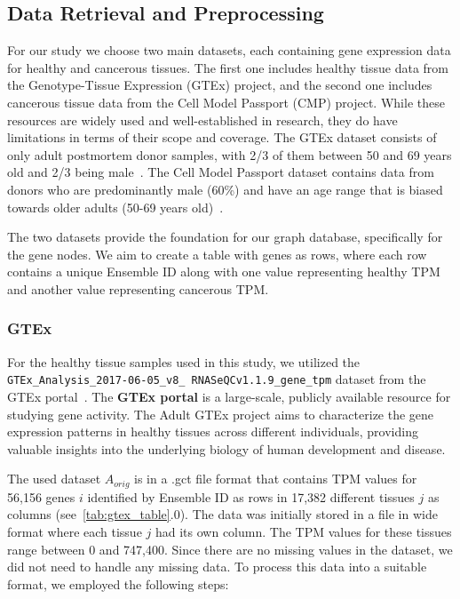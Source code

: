 \subsection{Data Retrieval and Preprocessing} \label{subsec:data}

For our study we choose two main datasets, each containing gene expression data for healthy and cancerous tissues.
The first one includes healthy tissue data from the Genotype-Tissue Expression (GTEx) project,
and the second one includes cancerous tissue data from the Cell Model Passport (CMP) project.
While these resources are widely used and well-established in research, they do have limitations in terms of their scope and coverage.
The GTEx dataset consists of only adult postmortem donor samples, with 2/3 of them between 50 and 69 years old and 2/3 being male~\cite{GTEX_modelannotation}.
The Cell Model Passport dataset contains data from donors who are predominantly male (60\%)
and have an age range that is biased towards older adults (50-69 years old)~\cite{CMP_modelannotation}.

The two datasets provide the foundation for our graph database, specifically for the gene nodes.
We aim to create a table with genes as rows,
where each row contains a unique Ensemble ID along with one value representing healthy TPM and another value representing cancerous TPM.
\\


\subsubsection*{GTEx} \label{subsubsec:GTEx}
For the healthy tissue samples used in this study,
we utilized the \texttt{GTEx\_Analysis\_2017-06-05\_v8\_\newline
RNASeQCv1.1.9\_gene\_tpm} dataset from the GTEx portal~\cite{gtex_download}.
The \textbf{GTEx portal} is a large-scale, publicly available resource for studying gene activity.
The Adult GTEx project aims to characterize the gene expression patterns in healthy tissues across different individuals,
providing valuable insights into the underlying biology of human development and disease.

The used dataset $A_{orig}$ is in a .gct file format that contains TPM values for 56,156 genes $i$ identified by
Ensemble ID as rows in 17,382 different tissues $j$ as columns (see~\cref{tab:gtex_table}.0).
The data was initially stored in a file in wide format where each tissue $j$ had its own column.
The TPM values for these tissues range between 0 and 747,400.
Since there are no missing values in the dataset, we did not need to handle any missing data.
To process this data into a suitable format, we employed the following steps:

